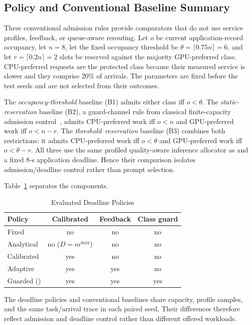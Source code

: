 \subsection{Policy and Conventional Baseline Summary}

Three conventional admission rules provide comparators that do not use service profiles, feedback, or queue-aware rerouting. Let $o$ be current application-record occupancy, let $n=8$, let the fixed occupancy threshold be $\theta=\lceil0.75n\rceil=6$, and let $r=\lceil0.2n\rceil=2$ slots be reserved against the majority GPU-preferred class. CPU-preferred requests are the protected class because their measured service is slower and they comprise 20\% of arrivals. The parameters are fixed before the test seeds and are not selected from their outcomes.

The \emph{occupancy-threshold} baseline (B1) admits either class iff $o<\theta$. The \emph{static-reservation} baseline (B2), a guard-channel rule from classical finite-capacity admission control~\cite{kelly1991loss}, admits CPU-preferred work iff $o<n$ and GPU-preferred work iff $o<n-r$. The \emph{threshold--reservation} baseline (B3) combines both restrictions: it admits CPU-preferred work iff $o<\theta$ and GPU-preferred work iff $o<\theta-r$. All three use the same profiled quality-aware inference allocator as \method{} and a fixed 8-s application deadline. Hence their comparison isolates admission/deadline control rather than prompt selection.

Table~\ref{tab:policies} separates the components.

\begin{table}[t]
\centering
\caption{Evaluated Deadline Policies}
\label{tab:policies}
\footnotesize
\begin{tabular}{@{}lccc@{}}
\toprule
Policy & Calibrated & Feedback & Class guard \\
\midrule
Fixed & no & no & no \\
Analytical & no ($D=m^{\max}$) & no & no \\
Calibrated & yes & no & no \\
Adaptive & yes & yes & no \\
Guarded (\method{}) & yes & yes & yes \\
\bottomrule
\end{tabular}
\end{table}

The deadline policies and conventional baselines share capacity, profile samples, and the same task/arrival trace in each paired seed. Their differences therefore reflect admission and deadline control rather than different offered workloads.
